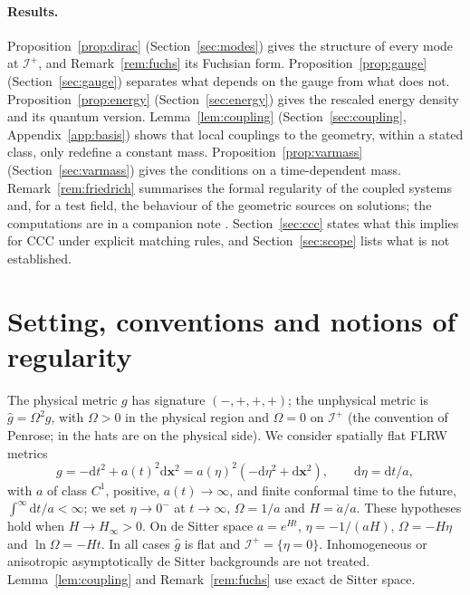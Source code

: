 \documentclass[11pt,a4paper]{article}
\theoremstyle{definition}
\newcommand{\scri}{\mathscr{I}^{+}}
\newcommand{\dd}{\mathrm{d}}
\newcommand{\hg}{\hat g}
\begin{document}
\paragraph{Results.} Proposition~\ref{prop:dirac} (Section~\ref{sec:modes}) gives the structure of every mode at $\scri$, and Remark~\ref{rem:fuchs} its Fuchsian form. Proposition~\ref{prop:gauge} (Section~\ref{sec:gauge}) separates what depends on the gauge from what does not. Proposition~\ref{prop:energy} (Section~\ref{sec:energy}) gives the rescaled energy density and its quantum version. Lemma~\ref{lem:coupling} (Section~\ref{sec:coupling}, Appendix~\ref{app:basis}) shows that local couplings to the geometry, within a stated class, only redefine a constant mass. Proposition~\ref{prop:varmass} (Section~\ref{sec:varmass}) gives the conditions on a time-dependent mass. Remark~\ref{rem:friedrich} summarises the formal regularity of the coupled systems and, for a test field, the behaviour of the geometric sources on solutions; the computations are in a companion note \cite{Companion}. Section~\ref{sec:ccc} states what this implies for CCC under explicit matching rules, and Section~\ref{sec:scope} lists what is not established.

\section{Setting, conventions and notions of regularity}
\label{sec:setting}

The physical metric $g$ has signature $(-,+,+,+)$; the unphysical metric is $\hg=\Omega^{2}g$, with $\Omega>0$ in the physical region and $\Omega=0$ on $\scri$ (the convention of Penrose; in \cite{Friedrich2015,Friedrich2017} the hats are on the physical side). We consider spatially flat FLRW metrics
\begin{equation}
g=-\dd t^{2}+a(t)^{2}\dd\mathbf{x}^{2}=a(\eta)^{2}(-\dd\eta^{2}+\dd\mathbf{x}^{2}),\qquad \dd\eta=\dd t/a,
\end{equation}
with $a$ of class $C^{1}$, positive, $a(t)\to\infty$, and finite conformal time to the future, $\int^{\infty}\dd t/a<\infty$; we set $\eta\to0^{-}$ at $t\to\infty$, $\Omega=1/a$ and $H=\dot a/a$. These hypotheses hold when $H\to H_{\infty}>0$. On de Sitter space $a=e^{Ht}$, $\eta=-1/(aH)$, $\Omega=-H\eta$ and $\ln\Omega=-Ht$. In all cases $\hg$ is flat and $\scri=\{\eta=0\}$. Inhomogeneous or anisotropic asymptotically de Sitter backgrounds are not treated. Lemma~\ref{lem:coupling} and Remark~\ref{rem:fuchs} use exact de Sitter space.
\end{document}

